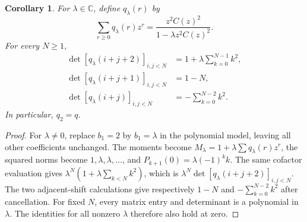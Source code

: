 \documentclass[11pt]{article}
\newtheorem{corollary}[theorem]{Corollary}
\begin{document}
\begin{corollary}\label{parameter}
For $\lambda\in\mathbb C$, define $q_\lambda(r)$ by
\[
\sum_{r\geq0}q_\lambda(r)z^r
 =\frac{z^2C(z)^2}{1-\lambda z^2C(z)^2}.
\]
For every $N\geq1$,
\begin{align*}
\det[q_\lambda(i+j+2)]_{i,j<N}
 &=1+\lambda\sum_{k=0}^{N-1}k^2,\\
\det[q_\lambda(i+j+1)]_{i,j<N}&=1-N,\\
\det[q_\lambda(i+j)]_{i,j<N}&=-\sum_{k=0}^{N-2}k^2.
\end{align*}
In particular, $q_2=q$.
\end{corollary}
\begin{proof}
For $\lambda\ne0$, replace $b_1=2$ by $b_1=\lambda$ in the
polynomial model, leaving all other coefficients unchanged. The
moments become $M_\lambda=1+\lambda\sum q_\lambda(r)z^r$,
the squared norms become $1,\lambda,\lambda,\ldots$, and
$P_{k+1}(0)=\lambda(-1)^k k$. The same cofactor evaluation gives
$\lambda^N(1+\lambda\sum_{k<N}k^2)$, which is
$\lambda^N\det[q_\lambda(i+j+2)]_{i,j<N}$.
The two adjacent-shift calculations give respectively $1-N$ and
$-\sum_{k=0}^{N-2}k^2$ after cancellation. For fixed $N$, every
matrix entry and determinant is a polynomial in $\lambda$.
The identities for all nonzero $\lambda$ therefore also hold at zero.
\end{proof}
\end{document}
